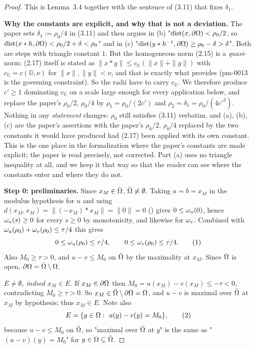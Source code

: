 \begin{proof}
This is Lemma~3.4 together with the sentence of (3.11) that fixes $\delta_1$.

\medskip\noindent\textbf{Why the constants are explicit, and why that is not a deviation.}
The paper sets $\delta_1:=\rho_0/4$ in (3.11) and then argues in (b) "$\operatorname{dist}(x,\partial\Omega)<\rho_0/2$,
so $\operatorname{dist}(x*h,\partial\Omega)<\rho_0/2+\delta<\rho_0$" and in (c) "$\operatorname{dist}(y*h^{-1},\partial\Omega)\ge\rho_0-\delta>\delta$".
Both are steps with triangle constant $1$. But the homogeneous norm (2.15) is a
\emph{quasi}-norm: (2.17) itself is stated as $\|x*y\|\le c_{\mathbb G}(\|x\|+\|y\|)$
with $c_{\mathbb G}=c(\mathbb G,\nu)$ for $\|x\|,\|y\|<\nu$, and that is exactly what
 provides (pm-0013 is the governing constraint). So the radii have to
carry $c_{\mathbb G}$. We therefore produce $c'\ge1$ dominating $c_{\mathbb G}$ on a scale
large enough for every application below, and replace the paper's $\rho_0/2$, $\rho_0/4$ by
$\rho_1=\rho_0/(2c')$ and $\rho_2=\delta_1=\rho_0/(4c'^{2})$. Nothing in any \emph{statement}
changes: $\rho_0$ still satisfies (3.11) verbatim, and (a), (b), (c) are the paper's
assertions with the paper's $\rho_0/2$, $\rho_0/4$ replaced by the two constants it would
have produced had (2.17) been applied with its own constant. This is the one place in
the formalization where the paper's constants are made explicit; the paper is read
precisely, not corrected. Part (a) uses no triangle inequality at all, and we keep it that
way so that the reader can see where the constants enter and where they do not.

\medskip\noindent\textbf{Step 0: preliminaries.} Since $x_M\in\bar{\Omega}$, $\bar{\Omega}\ne\emptyset$.
Taking $a=b=x_M$ in the modulus hypothesis for $u$ and using
$d(x_M,x_M)=\|(-x_M)*x_M\|=\|0\|=0$ () gives $0\le\omega_u(0)$, hence
$\omega_u(s)\ge0$ for every $s\ge0$ by monotonicity, and likewise for $\omega_v$. Combined with
$\omega_u(\rho_0)+\omega_v(\rho_0)\le\tau/4$ this gives
\[
 0\le\omega_u(\rho_0)\le\tau/4,\qquad 0\le\omega_v(\rho_0)\le\tau/4. \tag{1}
\]
Also $M_0\ge\tau>0$, and $u-v\le M_0$ on $\bar{\Omega}$ by the maximality at $x_M$. Since $\Omega$
is open, $\partial\Omega=\bar{\Omega}\setminus\Omega$.

\emph{$E\ne\emptyset$, indeed $x_M\in E$.} If $x_M\in\partial\Omega$ then $M_0=u(x_M)-v(x_M)\le-\tau<0$,
contradicting $M_0\ge\tau>0$. So $x_M\in\bar{\Omega}\setminus\partial\Omega=\Omega$, and $u-v$ is maximal over
$\bar{\Omega}$ at $x_M$ by hypothesis; thus $x_M\in E$. Note also
\[
 E=\{y\in\Omega:\ u(y)-v(y)=M_0\}, \tag{2}
\]
because $u-v\le M_0$ on $\bar{\Omega}$, so "maximal over $\bar{\Omega}$ at $y$" is the same as
"$(u-v)(y)=M_0$" for $y\in\Omega\subseteq\bar{\Omega}$.


\end{proof}
